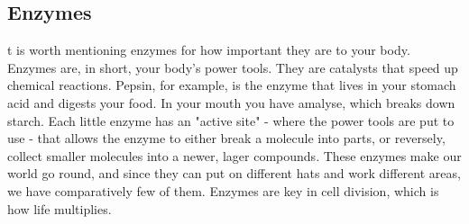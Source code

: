 \subsection*{Enzymes}
t is worth mentioning enzymes for how important they are to your body.
Enzymes are, in short, your body's power tools.
They are catalysts that speed up chemical reactions.
Pepsin, for example, is the enzyme that lives in your stomach acid and digests your food.
In your mouth you have amalyse, which breaks down starch.
Each little enzyme has an "active site" - where the power tools are put to use - that allows the enzyme to either break a molecule into parts, or reversely, collect smaller molecules into a newer, lager compounds.
These enzymes make our world go round, and since they can put on different hats and work different areas, we have comparatively few of them.
Enzymes are key in cell division, which is how life multiplies. 

